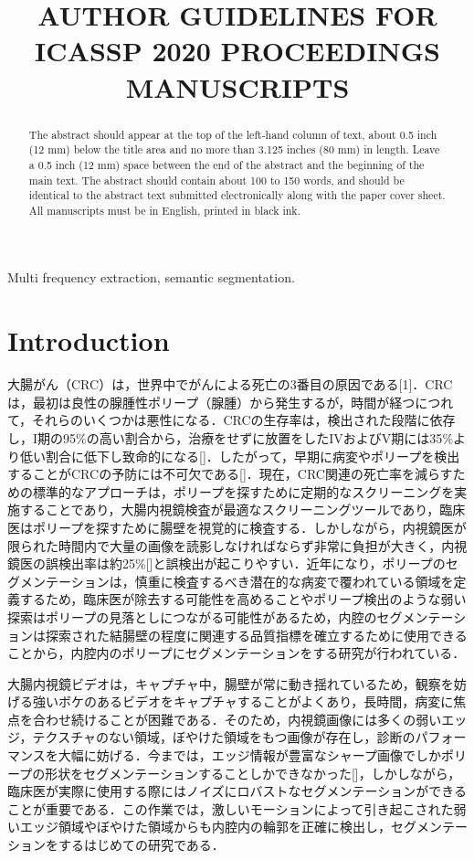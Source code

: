 \documentclass{article}
\title{AUTHOR GUIDELINES FOR ICASSP 2020 PROCEEDINGS MANUSCRIPTS}
\begin{document}
%
\maketitle
%
\begin{abstract}
The abstract should appear at the top of the left-hand column of text, about
0.5 inch (12 mm) below the title area and no more than 3.125 inches (80 mm) in
length.  Leave a 0.5 inch (12 mm) space between the end of the abstract and the
beginning of the main text.  The abstract should contain about 100 to 150
words, and should be identical to the abstract text submitted electronically
along with the paper cover sheet.  All manuscripts must be in English, printed
in black ink.
\end{abstract}
%
\begin{keywords}
Multi frequency extraction, semantic segmentation.
\end{keywords}
%
\section{Introduction}
\label{sec:intro}
大腸がん（CRC）は，世界中でがんによる死亡の3番目の原因である[1]．CRCは，最初は良性の腺腫性ポリープ（腺腫）から発生するが，時間が経つにつれて，それらのいくつかは悪性になる．CRCの生存率は，検出された段階に依存し，I期の95$\%$の高い割合から，治療をせずに放置をしたIVおよびV期には35$\%$より低い割合に低下し致命的になる[]．したがって，早期に病変やポリープを検出することがCRCの予防には不可欠である[]．現在，CRC関連の死亡率を減らすための標準的なアプローチは，ポリープを探すために定期的なスクリーニングを実施することであり，大腸内視鏡検査が最適なスクリーニングツールであり，臨床医はポリープを探すために腸壁を視覚的に検査する．しかしながら，内視鏡医が限られた時間内で大量の画像を読影しなければならず非常に負担が大きく，内視鏡医の誤検出率は約25$\%$[]と誤検出が起こりやすい．近年になり，ポリープのセグメンテーションは，慎重に検査するべき潜在的な病変で覆われている領域を定義するため，臨床医が除去する可能性を高めることやポリープ検出のような弱い探索はポリープの見落としにつながる可能性があるため，内腔のセグメンテーションは探索された結腸壁の程度に関連する品質指標を確立するために使用できることから，内腔内のポリープにセグメンテーションをする研究が行われている．

大腸内視鏡ビデオは，キャプチャ中，腸壁が常に動き揺れているため，観察を妨げる強いボケのあるビデオをキャプチャすることがよくあり，長時間，病変に焦点を合わせ続けることが困難である．そのため，内視鏡画像には多くの弱いエッジ，テクスチャのない領域，ぼやけた領域をもつ画像が存在し，診断のパフォーマンスを大幅に妨げる．今までは，エッジ情報が豊富なシャープ画像でしかポリープの形状をセグメンテーションすることしかできなかった[]，しかしながら，臨床医が実際に使用する際にはノイズにロバストなセグメンテーションができることが重要である．この作業では，激しいモーションによって引き起こされた弱いエッジ領域やぼやけた領域からも内腔内の輪郭を正確に検出し，セグメンテーションをするはじめての研究である．
\end{document}
